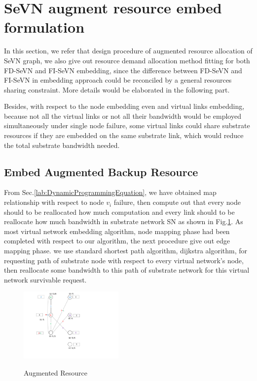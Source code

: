 \section{SeVN augment resource embed formulation}
In this section, we refer that design procedure of augmented resource allocation  of SeVN graph, we also give out resource demand allocation method fitting for both FD-SeVN and FI-SeVN embedding, since the difference between FD-SeVN and FI-SeVN in embedding approach could be reconciled by a general resources sharing constraint. More details would be elaborated in the following part.

Besides, with respect to the node embedding even and virtual links embedding, because not all the virtual links or not all their bandwidth would be employed simultaneously under single node failure, some virtual links could share substrate resources if they are embedded on the same substrate link, which would reduce the total substrate bandwidth needed.


\subsection{Embed Augmented Backup Resource}
From Sec.\ref{lab:DynamicProgrammingEquation}, we have obtained map relationship with respect to node $v_i$ failure, then compute out that every node should to be reallocated how much computation and every link should to be reallocate how much bandwidth in substrate network SN as shown in Fig.\ref{fig:AugmentResource}. As most virtual network embedding algorithm, node mapping phase had been completed with respect to our algorithm, the next procedure give out edge mapping phase. we use standard shortest path algorithm, dijkstra algorithm, for requesting path of substrate node with respect to every virtual network's node, then reallocate some bandwidth to this path of substrate network for this virtual network survivable request.

\begin{figure}
  \centering
  \includegraphics[width=2in]{Fig/AugmentResource}\\
  \caption{Augmented Resource}\label{fig:AugmentResource}
\end{figure}

